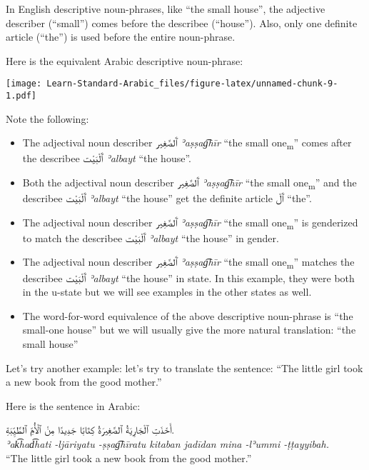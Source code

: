 \documentclass[
  10pt,
]{book}
\providecommand{\tightlist}{%
  \setlength{\itemsep}{0pt}\setlength{\parskip}{0pt}}
\begin{document}
In English descriptive noun-phrases, like \enquote{the small house}, the adjective describer (\enquote{small}) comes before the describee (\enquote{house}). Also, only one definite article (\enquote{the}) is used before the entire noun-phrase.

Here is the equivalent Arabic descriptive noun-phrase:

\texttt{[image: Learn-Standard-Arabic\_files/figure-latex/unnamed-chunk-9-1.pdf]}

Note the following:

\begin{itemize}
\tightlist
\item
  The adjectival noun describer \foreignlanguage{arabic}{ٱَلصَّغِير} \emph{ʾaṣṣag͡hīr} \enquote{the small one\textsubscript{m}} comes after the describee \foreignlanguage{arabic}{ٱَلْبَيْت} \emph{ʾalbayt} \enquote{the house}.
\item
  Both the adjectival noun describer \foreignlanguage{arabic}{ٱَلصَّغِير} \emph{ʾaṣṣag͡hīr} \enquote{the small one\textsubscript{m}} and the describee \foreignlanguage{arabic}{ٱَلْبَيْت} \emph{ʾalbayt} \enquote{the house} get the definite article \foreignlanguage{arabic}{ٱَلْ} \enquote{the}.
\item
  The adjectival noun describer \foreignlanguage{arabic}{ٱَلصَّغِير} \emph{ʾaṣṣag͡hīr} \enquote{the small one\textsubscript{m}} is genderized to match the describee \foreignlanguage{arabic}{ٱَلْبَيْت} \emph{ʾalbayt} \enquote{the house} in gender.
\item
  The adjectival noun describer \foreignlanguage{arabic}{ٱَلصَّغِير} \emph{ʾaṣṣag͡hīr} \enquote{the small one\textsubscript{m}} matches the describee \foreignlanguage{arabic}{ٱَلْبَيْت} \emph{ʾalbayt} \enquote{the house} in state. In this example, they were both in the u-state but we will see examples in the other states as well.
\item
  The word-for-word equivalence of the above descriptive noun-phrase is \enquote{the small-one house} but we will usually give the more natural translation: \enquote{the small house}
\end{itemize}

Let's try another example: let's try to translate the sentence: \enquote{The little girl took a new book from the good mother.}

Here is the sentence in Arabic:

\foreignlanguage{arabic}{أَخَذَتِ ٱلْجَارِيَةُ ٱلصَّغِيرَةُ کِتَابًا جَدِيدًا مِنْ ٱلْأُمِّ ٱلطَّيِّبَةِ.}\\
\emph{ʾak͡had͡hati -ljāriyatu -ṣṣag͡hīratu kitaban jadīdan mina -lʾummi -ṭṭayyibah.}\\
\enquote{The little girl took a new book from the good mother.}
\end{document}

